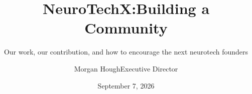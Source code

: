 \title[NeuroTechX / Community]{NeuroTechX:\newline Building a Community}
\subtitle{Our work, our contribution, and how to encourage the next neurotech founders}
\author[Morgan Hough]{Morgan Hough\newline Executive Director}
\date{September 7, 2026}
